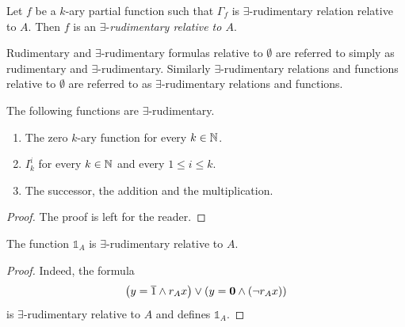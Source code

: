 \documentclass[10pt]{amsart}
\begin{document}
\begin{definition}
	Let $f$ be a $k$-ary partial function such that $\Gamma_f$ is $\exists$-rudimentary relation relative to $A$. Then $f$ is an $\exists$-\textit{rudimentary relative to $A$}.
\end{definition}

\begin{remark}\label{remark:}
	Rudimentary and $\exists$-rudimentary formulas relative to $\emptyset$ are referred to simply as rudimentary and $\exists$-rudimentary. Similarly $\exists$-rudimentary relations and functions relative to $\emptyset$ are referred to as $\exists$-rudimentary relations and functions.
\end{remark}

\begin{fact}\label{fact:basic_primitive_recursive_functions_are_existential_rudimentary}
	The following functions are $\exists$-rudimentary.
	\begin{enumerate}[label=\emph{\textbf{(\arabic*)}}, leftmargin=3.0em]
		\item The zero $k$-ary function for every $k \in {\mathbb N}$.
		\item $I^i_k$ for every $k \in {\mathbb N}$ and every $1 \leq i \leq k$.
		\item The successor, the addition and the multiplication.
	\end{enumerate}
\end{fact}
\begin{proof}
	The proof is left for the reader.
\end{proof}

\begin{fact}\label{fact:characteristic_function_of_oracle_set_is_existential_rudimentary_relatively}
	The function $\mathbb{1}_A$ is $\exists$-rudimentary relative to $A$.
\end{fact}
\begin{proof}
	Indeed, the formula
	$$\left(y = \overline{1} \wedge r_Ax\right)\vee \left(y = \mathbf{0} \wedge \left(\neg r_Ax\right)\right)$$
	is $\exists$-rudimentary relative to $A$ and defines $\mathbb{1}_A$.
\end{proof}
\end{document}
